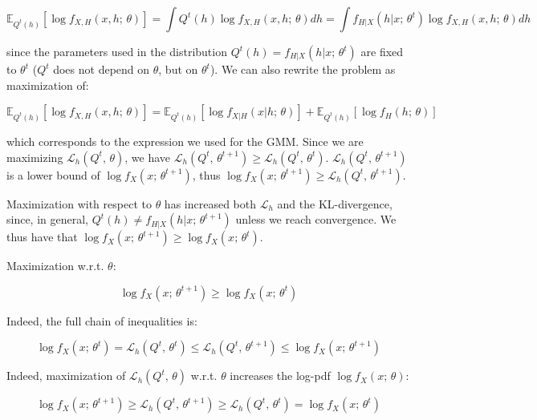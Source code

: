 \begin{equation*}
\mathbb{E}_{Q^t(h)}[\log f_{X,H}(x,h;\,\theta)] = \int Q^t(h) \log f_{X,H}(x,h;\,\theta) dh = \int f_{H|X}(h|x;\,\theta^t) \log f_{X,H}(x,h;\,\theta) dh
\end{equation*}

since the parameters used in the distribution $Q^t(h) = f_{H|X}(h | x;\,\theta^t)$ are fixed to $\theta^t$ ($Q^t$ does not depend on $\theta$, but on $\theta^t$). We can also rewrite the problem as maximization of:


\begin{equation*}
\mathbb{E}_{Q^t(h)}[\log f_{X,H}(x,h;\,\theta)] = \mathbb{E}_{Q^t(h)}[\log f_{X|H}(x|h;\,\theta)] + \mathbb{E}_{Q^t(h)}[\log f_H(h;\,\theta)]
\end{equation*}

which corresponds to the expression we used for the GMM. Since we are maximizing $\mathcal{L}_h(Q^t,\,\theta)$, we have $\mathcal{L}_h(Q^t,\,\theta^{t+1}) \geq \mathcal{L}_h(Q^t,\,\theta^t)$. $\mathcal{L}_h(Q^t,\,\theta^{t+1})$ is a lower bound of $\log f_X(x;\,\theta^{t+1})$, thus $\log f_X(x;\,\theta^{t+1}) \geq \mathcal{L}_h(Q^t,\,\theta^{t+1})$.

Maximization with respect to $\theta$ has increased both $\mathcal{L}_h$ and the KL-divergence, since, in general, $Q^t(h) \neq f_{H|X}(h | x;\,\theta^{t+1})$ unless we reach convergence. We thus have that $\log f_X(x;\,\theta^{t+1}) \geq \log f_X(x;\,\theta^t)$.

Maximization w.r.t. $\theta$:


\begin{equation*}
\log f_X(x;\,\theta^{t+1}) \geq \log f_X(x;\,\theta^t)
\end{equation*}

Indeed, the full chain of inequalities is:


\begin{equation*}
\log f_X(x;\,\theta^t) = \mathcal{L}_h(Q^t,\,\theta^t) \leq \mathcal{L}_h(Q^t,\,\theta^{t+1}) \leq \log f_X(x;\,\theta^{t+1})
\end{equation*}

Indeed, maximization of $\mathcal{L}_h(Q^t,\,\theta)$ w.r.t. $\theta$ increases the log-pdf $\log f_X(x;\,\theta)$:


\begin{equation*}
\log f_X(x;\,\theta^{t+1}) \geq \mathcal{L}_h(Q^t,\,\theta^{t+1}) \geq \mathcal{L}_h(Q^t,\,\theta^t) = \log f_X(x;\,\theta^t)
\end{equation*}

